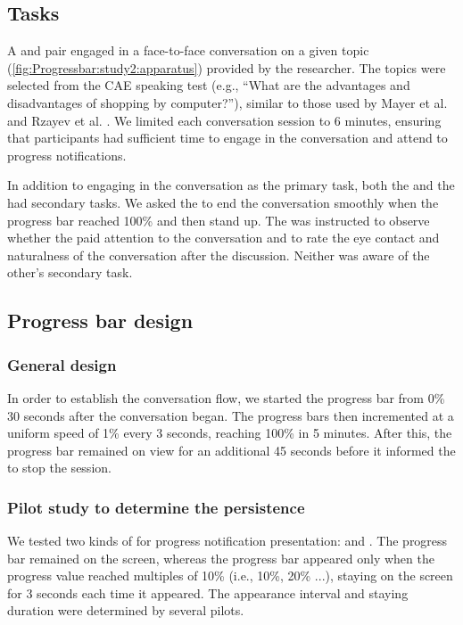 \subsection{Tasks}
 
A \receiver{} and \observer{} pair engaged in a face-to-face conversation on a given topic (\autoref{fig:Progressbar:study2:apparatus}) provided by the researcher. The topics were selected from the CAE speaking test \cite{cambridge2008speaking} (e.g., ``What are the advantages and disadvantages of shopping by computer?''), similar to those used by Mayer et al. \cite{mayer_evaluating_2018} and Rzayev et al. \cite{rzayev_effects_2020}. We limited each conversation session to 6 minutes, ensuring that participants had sufficient time to engage in the conversation and attend to progress notifications. 

In addition to engaging in the conversation as the primary task, both the \receiver{} and the \observer{} had secondary tasks. We asked the \receiver{} to end the conversation smoothly when the progress bar reached 100\% and then stand up. The \observer{} was instructed to observe whether the \receiver{} paid attention to the conversation and to rate the eye contact and naturalness of the conversation after the discussion. Neither was aware of the other's secondary task.

\subsection{Progress bar design}

\subsubsection*{General design}

In order to establish the conversation flow, we started the progress bar from 0\% 30 seconds after the conversation began. The progress bars then incremented at a uniform speed of 1\% every 3 seconds, reaching 100\% in 5 minutes. After this, the progress bar remained on view for an additional 45 seconds before it informed the \receiver{} to stop the session.

\subsubsection*{Pilot study to determine the persistence}
\label{study2:pilot_persistance}

We tested two kinds of \persistence{} for progress notification presentation: \continuous{} and \intermittent{}. The \continuous{} progress bar remained on the screen, whereas the \intermittent{} progress bar appeared only when the progress value reached multiples of 10\% (i.e., 10\%, 20\% ...), staying on the screen for 3 seconds each time it appeared. The appearance interval and staying duration were determined by several pilots.

